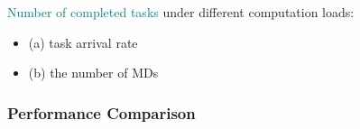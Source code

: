 \begin{frame}
\begin{figure}
\end{figure}

\textcolor{teal}{Number of completed tasks} under different computation loads:
	\begin{itemize}[]
	
	\item (a) task arrival rate
	
	\item (b) the number of MDs
	
\end{itemize}
	
\end{frame}


\begin{frame}
	\frametitle{Performance Comparison}
	

\end{frame}
